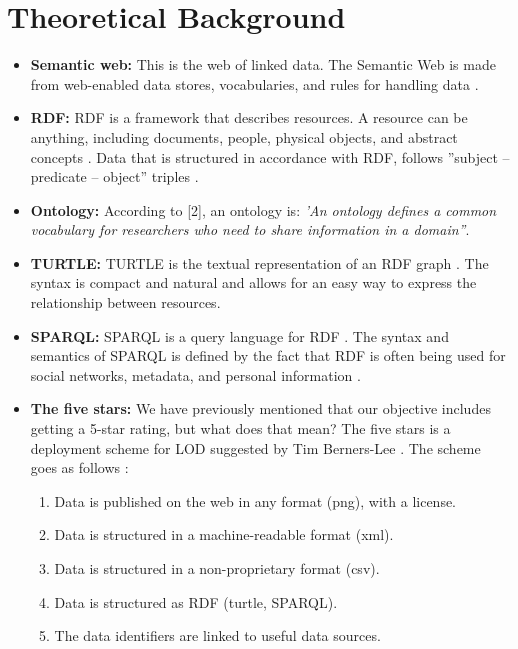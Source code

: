 \chapter{Theoretical Background}

\begin{itemize}
\item \textbf{Semantic web:} This is the web of linked data. The Semantic Web is made from web-enabled data stores, vocabularies, and rules for handling data \cite{semantic}.

\item \textbf{RDF:} RDF is a framework that describes resources. A resource can be anything, including documents, people, physical objects, and abstract concepts \cite{rdf}. Data that is structured in accordance with RDF, follows ''subject – predicate – object'' triples \cite{rdf}.

\item \textbf{Ontology:} According to [2], an ontology is: \textit{'An ontology defines a common vocabulary for researchers who need to share information in a domain''}.

\item \textbf{TURTLE:} TURTLE is the textual representation of an RDF graph \cite{turtle}. The syntax is compact and natural and allows for an easy way to express the relationship between resources.

\item \textbf{SPARQL:} SPARQL is a query language for RDF \cite{sparql}. The syntax and semantics of SPARQL is defined by the fact that RDF is often being used for social networks, metadata, and personal information \cite{sparql}.

\item \textbf{The five stars:} We have previously mentioned that our objective includes getting a 5-star rating, but what does that mean? The five stars is a deployment scheme for LOD suggested by Tim Berners-Lee \cite{lod}. The scheme goes as follows \cite{lod}:

	\begin{enumerate}
	\item Data is published on the web in any format (png), with a license.
	\item Data is structured in a machine-readable format (xml).
	\item Data is structured in a non-proprietary format (csv).
	\item Data is structured as RDF (turtle, SPARQL).
	\item The data identifiers are linked to useful data sources.
	\end{enumerate}

\end{itemize}

